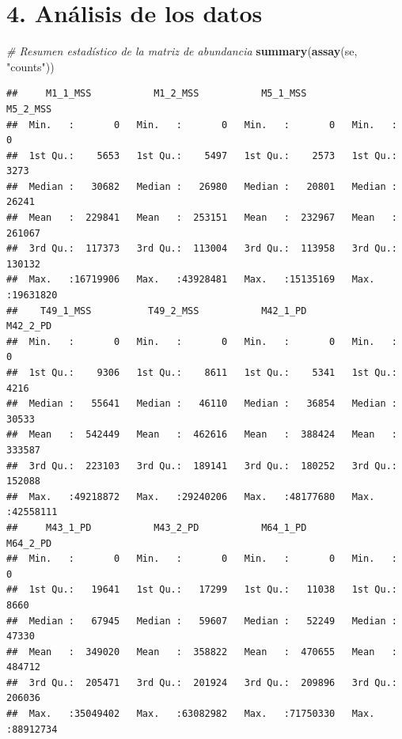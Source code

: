 \documentclass[
]{article}
\newenvironment{Shaded}{\begin{snugshade}}{\end{snugshade}}
\newcommand{\CommentTok}[1]{\textcolor[rgb]{0.56,0.35,0.01}{\textit{#1}}}
\newcommand{\FunctionTok}[1]{\textcolor[rgb]{0.13,0.29,0.53}{\textbf{#1}}}
\newcommand{\NormalTok}[1]{#1}
\newcommand{\StringTok}[1]{\textcolor[rgb]{0.31,0.60,0.02}{#1}}
\begin{document}
\section{4. Análisis de los datos}\label{anuxe1lisis-de-los-datos}

\begin{Shaded}
\begin{Highlighting}[]
\CommentTok{\# Resumen estadístico de la matriz de abundancia}
\FunctionTok{summary}\NormalTok{(}\FunctionTok{assay}\NormalTok{(se, }\StringTok{"counts"}\NormalTok{))}
\end{Highlighting}
\end{Shaded}

\begin{verbatim}
##     M1_1_MSS           M1_2_MSS           M5_1_MSS           M5_2_MSS       
##  Min.   :       0   Min.   :       0   Min.   :       0   Min.   :       0  
##  1st Qu.:    5653   1st Qu.:    5497   1st Qu.:    2573   1st Qu.:    3273  
##  Median :   30682   Median :   26980   Median :   20801   Median :   26241  
##  Mean   :  229841   Mean   :  253151   Mean   :  232967   Mean   :  261067  
##  3rd Qu.:  117373   3rd Qu.:  113004   3rd Qu.:  113958   3rd Qu.:  130132  
##  Max.   :16719906   Max.   :43928481   Max.   :15135169   Max.   :19631820  
##    T49_1_MSS          T49_2_MSS           M42_1_PD           M42_2_PD       
##  Min.   :       0   Min.   :       0   Min.   :       0   Min.   :       0  
##  1st Qu.:    9306   1st Qu.:    8611   1st Qu.:    5341   1st Qu.:    4216  
##  Median :   55641   Median :   46110   Median :   36854   Median :   30533  
##  Mean   :  542449   Mean   :  462616   Mean   :  388424   Mean   :  333587  
##  3rd Qu.:  223103   3rd Qu.:  189141   3rd Qu.:  180252   3rd Qu.:  152088  
##  Max.   :49218872   Max.   :29240206   Max.   :48177680   Max.   :42558111  
##     M43_1_PD           M43_2_PD           M64_1_PD           M64_2_PD       
##  Min.   :       0   Min.   :       0   Min.   :       0   Min.   :       0  
##  1st Qu.:   19641   1st Qu.:   17299   1st Qu.:   11038   1st Qu.:    8660  
##  Median :   67945   Median :   59607   Median :   52249   Median :   47330  
##  Mean   :  349020   Mean   :  358822   Mean   :  470655   Mean   :  484712  
##  3rd Qu.:  205471   3rd Qu.:  201924   3rd Qu.:  209896   3rd Qu.:  206036  
##  Max.   :35049402   Max.   :63082982   Max.   :71750330   Max.   :88912734
\end{verbatim}
\end{document}
